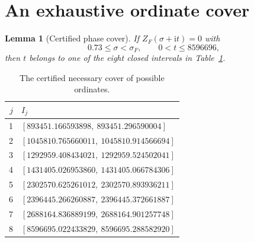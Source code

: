 \documentclass[11pt]{article}
\newtheorem{lemma}[theorem]{Lemma}
\theoremstyle{remark}
\newcommand{\ii}{\mathrm{i}}
\newcommand{\ZF}{Z_F}
\begin{document}
\section{An exhaustive ordinate cover}

\begin{lemma}[Certified phase cover]\label{lem:phase-cover}
If $\ZF(\sigma+\ii t)=0$ with
\[
 0.73\leq\sigma<\sigma_F,
 \qquad 0<t\leq8596696,
\]
then $t$ belongs to one of the eight closed intervals in
Table~\ref{tab:phase-intervals}.
\end{lemma}

\begin{table}[ht]
\centering
\caption{The certified necessary cover of possible ordinates.}
\label{tab:phase-intervals}
\begin{tabular}{r@{\qquad}l}
\toprule
$j$ & $I_j$\\
\midrule
1 & $[893451.166593898,\ 893451.296590004]$\\
2 & $[1045810.765660011,\ 1045810.914566694]$\\
3 & $[1292959.408434021,\ 1292959.524502041]$\\
4 & $[1431405.026953860,\ 1431405.066784306]$\\
5 & $[2302570.625261012,\ 2302570.893936211]$\\
6 & $[2396445.266260887,\ 2396445.372661887]$\\
7 & $[2688164.836889199,\ 2688164.901257748]$\\
8 & $[8596695.022433829,\ 8596695.288582920]$\\
\bottomrule
\end{tabular}
\end{table}
\end{document}
